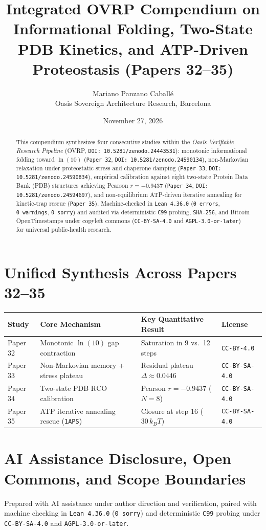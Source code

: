 \documentclass[11pt,a4paper]{article}
\title{Integrated OVRP Compendium on Informational Folding, Two-State PDB Kinetics, and ATP-Driven Proteostasis (Papers 32--35)}
\author{Mariano Panzano Caball\'e \\ \small Oasis Sovereign Architecture Research, Barcelona}
\date{November 27, 2026}
\begin{document}
\maketitle

\begin{abstract}
This compendium synthesizes four consecutive studies within the \emph{Oasis Verifiable Research Pipeline} (OVRP, \texttt{DOI: 10.5281/zenodo.24443531}): monotonic informational folding toward $\ln(10)$ (\texttt{Paper~32}, \texttt{DOI: 10.5281/zenodo.24590134}), non-Markovian relaxation under proteostatic stress and chaperone damping (\texttt{Paper~33}, \texttt{DOI: 10.5281/zenodo.24590834}), empirical calibration against eight two-state Protein Data Bank (PDB) structures achieving Pearson $r = -0.9437$ (\texttt{Paper~34}, \texttt{DOI: 10.5281/zenodo.24594697}), and non-equilibrium ATP-driven iterative annealing for kinetic-trap rescue (\texttt{Paper~35}). Machine-checked in \texttt{Lean~4.36.0} (\texttt{0~errors}, \texttt{0~warnings}, \texttt{0~sorry}) and audited via deterministic \texttt{C99} probing, \texttt{SHA-256}, and Bitcoin OpenTimestamps under copyleft commons (\texttt{CC-BY-SA-4.0} and \texttt{AGPL-3.0-or-later}) for universal public-health research.
\end{abstract}

\section{Unified Synthesis Across Papers 32--35}
\begin{center}
\begin{tabular}{llll}
\toprule
\textbf{Study} & \textbf{Core Mechanism} & \textbf{Key Quantitative Result} & \textbf{License} \\
\midrule
Paper 32 & Monotonic $\ln(10)$ gap contraction & Saturation in 9 vs.\ 12 steps & \texttt{CC-BY-4.0} \\
Paper 33 & Non-Markovian memory + stress plateau & Residual plateau $\Delta \approx 0.0446$ & \texttt{CC-BY-SA-4.0} \\
Paper 34 & Two-state PDB $\mathrm{RCO}$ calibration & Pearson $r = -0.9437$ ($N=8$) & \texttt{CC-BY-SA-4.0} \\
Paper 35 & ATP iterative annealing rescue (\texttt{1APS}) & Closure at step 16 ($30\,k_B T$) & \texttt{CC-BY-SA-4.0} \\
\bottomrule
\end{tabular}
\end{center}

\section*{AI Assistance Disclosure, Open Commons, and Scope Boundaries}
Prepared with AI assistance under author direction and verification, paired with machine checking in \texttt{Lean~4.36.0} (\texttt{0~sorry}) and deterministic \texttt{C99} probing under \texttt{CC-BY-SA-4.0} and \texttt{AGPL-3.0-or-later}.
\end{document}
